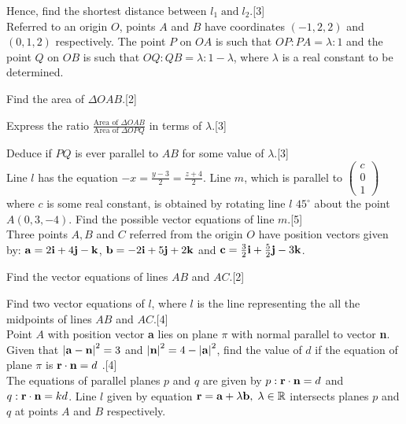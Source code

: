 \documentclass[12pt, a4 paper]{article}
\begin{document}
\begin{outline}[enumerate]
	\2 Hence, find the shortest distance between ${l_1}\;{\textrm{and}}\;{l_2}$.\hfill[3]\\

	\1 Referred to an origin $O$, points $A$ and $B$ have coordinates $(-1,2,2)$ and $(0,1,2)$ respectively. The point $P$ on $OA$ is such that $OP:PA = \lambda :1$ and the point $Q$ on $OB$ is such that $OQ:QB = \lambda :1 - \lambda $, where $\lambda $ is a real constant to be determined.

	\2 Find the area of $\Delta OAB$.\hfill[2]

	\2 Express the ratio $\frac{{{\textrm{Area of }}\Delta OAB}}{{{\textrm{Area of }}\Delta OPQ}}$ in terms of $\lambda $.\hfill[3]

	\2 Deduce if $PQ$ is ever parallel to $AB$ for some value of $\lambda$.\hfill[3]\\

	\1 Line $l$ has the equation $ - x = \frac{{y - 3}}{2} = \frac{{z + 4}}{2}$. Line $m$, which is parallel to $\left( {\begin{array}{*{20}{c}}c\\0\\1\end{array}} \right)$ where $c$ is some real constant, is obtained by rotating line $l$ $45^\circ $ about the point $A(0,3, - 4)$. Find the possible vector equations of line $m$.\hfill[5]\\

	\1 Three points $A, B$ and $C$ referred from the origin $O$ have position vectors given by:
	${\bf{a}} = 2{\bf{i}} + 4{\bf{j}} - {\bf{k}}$, ${\bf{b}} =  - 2{\bf{i}} + 5{\bf{j}} + 2{\bf{k}}$ and ${\bf{c}} = \frac{3}{2}{\bf{i}} + \frac{5}{2}{\bf{j}} - 3{\bf{k}}$.

	\2 Find the vector equations of lines $AB$ and $AC$.\hfill[2]

	\2 Find two vector equations of $l$, where $l$ is the line representing the all the midpoints of lines $AB$ and $AC$.\hfill[4]\\

	\1 Point $A$ with position vector \textbf{a} lies on plane $\pi $ with normal parallel to vector \textbf{n}. Given that ${\left| {{\bf{a}} - {\bf{n}}} \right|^2} = 3$ and ${\left| {\bf{n}} \right|^2} = 4 - {\left| {\bf{a}} \right|^2}$, find the value of $d$ if the equation of plane $\pi $ is ${\bf{r}} \cdot {\bf{n}} = d$
	.\hfill[4]\\

	\1 The equations of parallel planes $p$ and $q$ are given by $p:{\bf{r}} \cdot {\bf{n}} = d$ and $q:{\bf{r}} \cdot {\bf{n}} = kd$. Line $l$ given by equation ${\bf{r}} = {\bf{a}} + \lambda {\bf{b}},\;\lambda  \in \mathbb{R}$ intersects planes $p$ and $q$ at points $A$ and $B$ respectively.


\end{outline}
\end{document}
